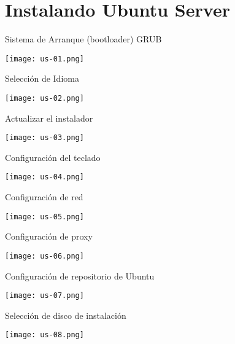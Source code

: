 \section{Instalando Ubuntu Server}

\begin{frame}[c]{Sistema de Arranque (bootloader) GRUB}
  \begin{center}
    \texttt{[image: us-01.png]}
  \end{center}
\end{frame}

\begin{frame}[c]{Selección de Idioma}
  \begin{center}
    \texttt{[image: us-02.png]}
  \end{center}
\end{frame}

\begin{frame}[c]{Actualizar el instalador}
  \begin{center}
    \texttt{[image: us-03.png]}
  \end{center}
\end{frame}

\begin{frame}[c]{Configuración del teclado}
  \begin{center}
    \texttt{[image: us-04.png]}
  \end{center}
\end{frame}

\begin{frame}[c]{Configuración de red}
  \begin{center}
    \texttt{[image: us-05.png]}
  \end{center}
\end{frame}

\begin{frame}[c]{Configuración de proxy}
  \begin{center}
    \texttt{[image: us-06.png]}
  \end{center}
\end{frame}

\begin{frame}[c]{Configuración de repositorio de Ubuntu}
  \begin{center}
    \texttt{[image: us-07.png]}
  \end{center}
\end{frame}

\begin{frame}[c]{Selección de disco de instalación}
  \begin{center}
    \texttt{[image: us-08.png]}
  \end{center}
\end{frame}

